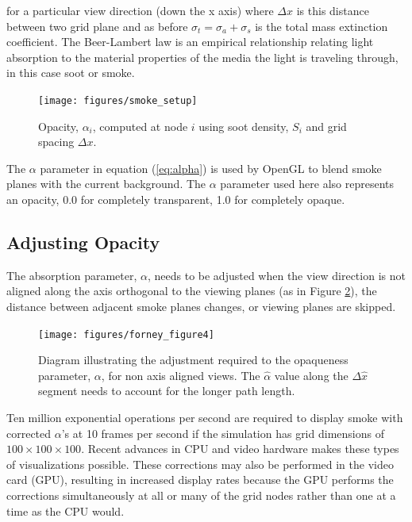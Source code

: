 \noindent for a particular view direction (down the x axis) where $\Delta x$ is this distance between two grid plane and as before $\sigma_t=\sigma_a+\sigma_s$ is the total mass extinction coefficient.  The Beer-Lambert law is an empirical relationship relating light absorption to the material properties of the media the light is traveling through, in this case soot or smoke.

\begin{figure}[\figoptions]
\begin{center}
\texttt{[image: figures/smoke\_setup]}
\end{center}
\caption {Opacity, $\alpha_i$, computed at node $i$ using soot density, $S_i$ and grid spacing $\Delta x$.}
\label{figsmokesetup}
\end{figure}

The $\alpha$ parameter in equation (\ref{eq:alpha}) is used by OpenGL to blend smoke planes with the current background.  The $\alpha$ parameter used here also represents an opacity, 0.0 for completely transparent, 1.0 for completely opaque.

%
%

\subsection{Adjusting Opacity}

The absorption parameter, $\alpha$, needs to be adjusted when the view direction is not aligned along the axis orthogonal to the viewing planes (as in Figure \ref{figray}), the distance between adjacent smoke planes changes, or viewing planes are skipped.

\begin{figure}[\figoptions]
\centerline{\texttt{[image: figures/forney\_figure4]}}
\caption [Diagram illustrating the adjustment required to the opaqueness parameter, $\alpha$,
for non-axis aligned views.] { Diagram
illustrating the adjustment required to the opaqueness parameter, $\alpha$,
for non axis aligned views. The $\hat{\alpha}$ value along the $\Delta\hat{x}$ segment needs to account for
the longer path length. } \label{figray}
\end{figure}

Ten million exponential operations per second are required to display smoke with corrected $\alpha$'s at 10 frames per second if the simulation has grid dimensions of $100\times 100\times 100$. Recent advances in CPU and video hardware makes these types of visualizations possible. These corrections may also be performed in the video card (GPU), resulting in increased display rates because the GPU performs the corrections simultaneously at all or many of the grid nodes rather than one at a time as the CPU would.

